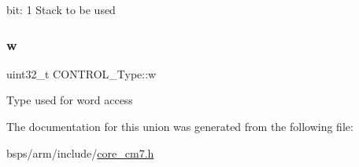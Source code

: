 bit\+: 1 Stack to be used \mbox{\label{unionCONTROL__Type_a6b642cca3d96da660b1198c133ca2a1f}} 
\subsubsection{\texorpdfstring{w}{w}}
{\footnotesize\ttfamily uint32\+\_\+t C\+O\+N\+T\+R\+O\+L\+\_\+\+Type\+::w}

Type used for word access 

The documentation for this union was generated from the following file\+:\begin{DoxyCompactItemize}
\item 
bsps/arm/include/\mbox{\hyperlink{core__cm7_8h}{core\+\_\+cm7.\+h}}\end{DoxyCompactItemize}
